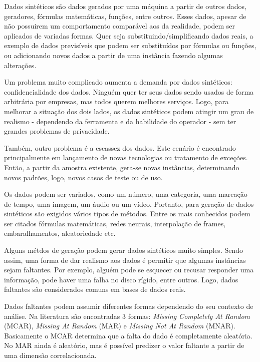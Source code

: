 \documentclass[
	12pt,				%
	openright,			%
	oneside,			%
	a4paper,			%
	english,			%
	brazil				%
	]{abntex2}
\begin{document}
	Dados sintéticos são dados gerados por uma máquina a partir de outros dados, geradores, fórmulas matemáticas, funções, entre outros.
	Esses dados, apesar de não possuirem um comportamento comparável aos da realidade, podem ser aplicados de variadas formas.
	Quer seja substituindo/simplificando dados reais, a exemplo de dados previsíveis que podem ser substituídos por fórmulas ou funções, ou adicionando novos dados a partir de uma instância fazendo algumas alterações. \cite{pensamentos-dados-sinteticos}
	\cite{pensamentos-dados-sinteticos}
	\par
	Um problema muito complicado aumenta a demanda por dados sintéticos: confidencialidade dos dados.
	Ninguém quer ter seus dados sendo usados de forma arbitrária por empresas, mas todos querem melhores serviços.
	Logo, para melhorar a situação dos dois lados, os dados sintéticos podem atingir um grau de realismo - dependendo da ferramenta e da habilidade do operador - sem ter grandes problemas de privacidade. \cite{pensamentos-dados-sinteticos}
	\par
	Também, outro problema é a escassez dos dados.
	Este cenário é encontrado principalmente em lançamento de novas tecnologias ou tratamento de exceções.
	Então, a partir da amostra existente, gera-se novas instâncias, determinando novos padrões, logo, novos casos de teste ou de uso.
	\par
	Os dados podem ser variados, como um número, uma categoria, uma marcação de tempo, uma imagem, um áudio ou um vídeo.
	Portanto, para geração de dados sintéticos são exigidos vários tipos de métodos.
	Entre os mais conhecidos podem ser citados fórmulas matemáticas, redes neurais, interpolação de frames, embaralhamentos, aleatoriedade etc.
	\par
	Alguns métdos de geração podem gerar dados sintéticos muito simples.
	Sendo assim, uma forma de dar realismo aos dados é permitir que algumas instâncias sejam faltantes.
	Por exemplo, alguém pode se esquecer ou recusar responder uma informação, pode haver uma falha no disco rígido, entre outros.
	Logo, dados faltantes são considerados comuns em bases de dados reais.
	\par
	Dados faltantes podem assumir diferentes formas dependendo do seu contexto de análise.
	Na literatura são encontradas 3 formas: \emph{Missing Completely At Random} (MCAR), \emph{Missing At Random} (MAR) e \emph{Missing Not At Random} (MNAR).
	Basicamente o MCAR determina que a falta do dado é completamente aleatória.
	No MAR ainda é aleatório, mas é possível predizer o valor faltante a partir de uma dimensão correlacionada.
\end{document}
